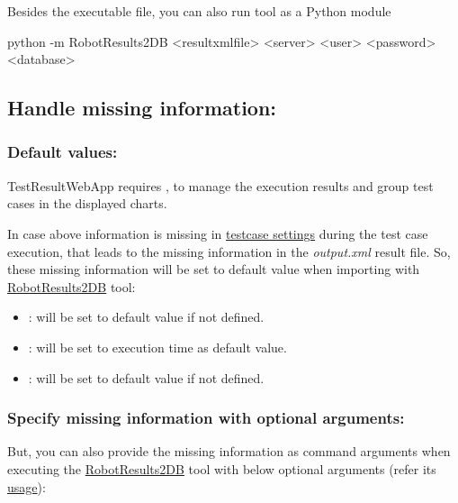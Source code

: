 Besides the executable file, you can also run tool as a Python module
\begin{robotlog}
python -m RobotResults2DB <resultxmlfile> <server> <user> <password> <database>
\end{robotlog}

\subsection{Handle missing information:}
\subsubsection{Default values:}
TestResultWebApp requires ,  to manage the 
execution results and  group test cases in the displayed charts.

In case above information is missing in \hyperref[description-robotframework-testcase-settings]
{testcase settings} during the test case execution, that leads to the 
missing information in the \emph{output.xml} result file.
So, these missing information will be set to default value when importing with
\href{https://github.com/test-fullautomation/robotframework-testresultwebapptool}{RobotResults2DB}
tool:

\begin{itemize}
\tightlist
\item {}: will be set to default value  if not defined.

\item {}: will be set to execution time
   as default value.

\item {}: will be set to default value  if not
  defined.
\end{itemize}

\subsubsection{Specify missing information with optional arguments:}
But, you can also provide the missing information as command arguments when executing the
\href{https://github.com/test-fullautomation/robotframework-testresultwebapptool}{RobotResults2DB}
tool with below optional arguments (refer its
\href{https://github.com/test-fullautomation/robotframework-testresultwebapptool\#usage}{usage}):

